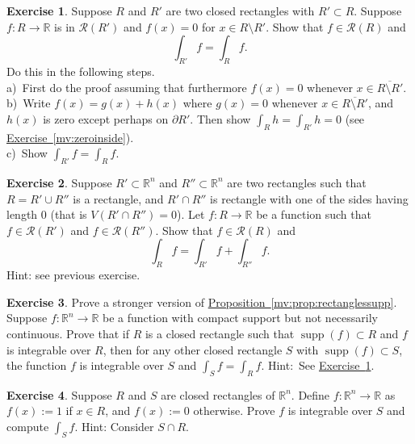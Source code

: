 \documentclass[12pt]{book}
\newcommand{\R}{{\mathbb{R}}}
\newcommand{\sR}{{\mathcal{R}}}
\theoremstyle{plain}
\theoremstyle{remark}
\theoremstyle{definition}
\theoremstyle{exercise}
\newtheorem{exercise}{Exercise}[section]
\theoremstyle{example}
\newcommand{\exerciseref}[1]{\hyperref[#1]{Exercise~\ref*{#1}}}
\newcommand{\propref}[1]{\hyperref[#1]{Proposition~\ref*{#1}}}
\begin{document}
\begin{exercise} \label{mv:zerooutside}
Suppose $R$ and $R'$ are two closed rectangles with $R' \subset R$.  Suppose $f \colon R \to \R$ is in $\sR(R')$
and $f(x) = 0$ for $x \in R \setminus R'$.
Show that $f \in \sR(R)$ and
\begin{equation*}
\int_{R'} f = \int_R f .
\end{equation*}
Do this in the following steps.\\
a)~First do the proof assuming that furthermore $f(x) = 0$ whenever $x
\in \overline{R \setminus R'}$.\\
b)~Write $f(x) = g(x) + h(x)$ where $g(x) = 0$ whenever $x
\in \overline{R \setminus R'}$, and $h(x)$ is zero except perhaps on
$\partial R'$.
Then show $\int_R h = \int_{R'} h = 0$ (see \exerciseref{mv:zeroinside}).\\
c)~Show 
$\int_{R'} f = \int_R f$.
\end{exercise}

\begin{exercise}
Suppose $R' \subset \R^n$ and $R'' \subset \R^n$ are two rectangles
such that $R = R' \cup R''$ is a rectangle, and $R' \cap R''$ is rectangle
with one of the sides having length 0 (that is $V(R' \cap R'') = 0$).
Let $f \colon R \to \R$ be a function such that $f \in \sR(R')$ and
$f \in \sR(R'')$.  Show that $f \in \sR(R)$ and
\begin{equation*}
\int_{R} f = \int_{R'} f + \int_{R''} f .
\end{equation*}
Hint: see previous exercise.
\end{exercise}

\begin{exercise}
Prove a stronger version of \propref{mv:prop:rectanglessupp}.
Suppose $f \colon \R^n \to \R$ be a function with compact support but not
necessarily continuous.
Prove that
if $R$ is a closed rectangle such that $\operatorname{supp}(f) \subset R$
and $f$ is integrable over $R$, then for any other closed rectangle
$S$ with $\operatorname{supp}(f) \subset S$,
the function $f$ is integrable over $S$ and
$\int_S f = \int_R f$.
Hint:~See \exerciseref{mv:zerooutside}.
\end{exercise}

\begin{exercise}
Suppose $R$ and $S$ are closed rectangles of $\R^n$.
Define $f \colon \R^n \to \R$ as $f(x) := 1$ if 
$x \in R$, and $f(x) := 0$ otherwise.  Prove $f$ is integrable over $S$
and compute $\int_S f$.  Hint: Consider $S \cap R$.
\end{exercise}
\end{document}
